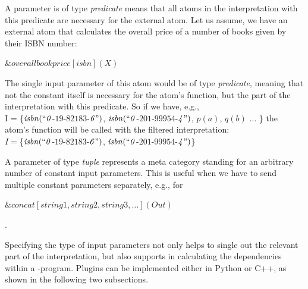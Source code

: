 \documentclass[a4paper, titlepage]{article}
\newcommand{\ext}[3]{\ensuremath{\&{#1}[#2](#3)}}
\begin{document}
A parameter is of type \emph{predicate} means that 
all atoms in the interpretation with this predicate are 
necessary for the external atom. Let us assume, we have an external 
atom that calculates the overall price of a number of books 
given by their ISBN number:\\
\centerline{$\ext{overallbookprice}{isbn}{X}$}
The single input parameter of this atom would be of type 
\emph{predicate}, meaning that not the constant itself is 
necessary for the atom's function, but the part of the 
interpretation with this predicate. So if we have, e.g.,\\ 
I = \{$\mathit{isbn(``0}$-$\mathit{19}$-$\mathit{82183}$-$\mathit{6")}$, $ \mathit{isbn(``0}$-$\mathit{201}$-$\mathit{99954}$-$\mathit{4")}$, $p(a)$, $q(b)$ $\dots$ \}
the atom's function will be called with the filtered interpretation: \\
$I=$\{$\mathit{isbn(``0}$-$\mathit{19}$-$\mathit{82183}$-$\mathit{6")}$, $ \mathit{isbn(``0}$-$\mathit{201}$-$\mathit{99954}$-$\mathit{4")}$\}

A parameter of type \emph{tuple} represents a meta category standing for an arbitrary number of constant input parameters. This is useful when we have to send multiple constant parameters separately, e.g., for \\
\centerline{$\ext{concat}{string1, string2, string3, \dots}{Out}$}. 

Specifying the type of input parameters not only helps to 
single out the relevant part of the interpretation, but 
also supports \dlvhex{} in calculating the dependencies 
within a \hex-program. Plugins can be implemented either in Python or C++, as shown in the following two subsections.
\end{document}
